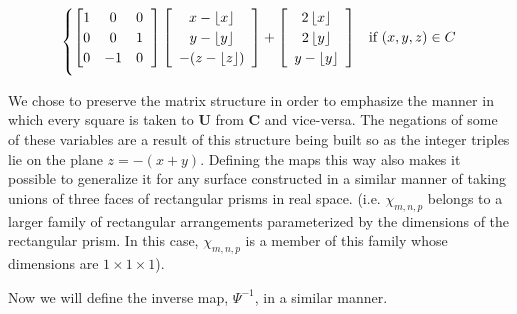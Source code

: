 \documentclass[]{article}
\begin{document}
\begin{equation}
\begin{cases}
		\left[ \begin{matrix}
		1 & 0 & 0 \\
		0 & 0 & 1 \\
		0 & -1 & 0
		\end{matrix}\hspace{2mm}\right]
		\left[\begin{array}{c}
			x - \left\lfloor x \right\rfloor
			\\ y- \left\lfloor y \right\rfloor
			\\ -(z - \left\lfloor z \right\rfloor)
			\end{array} \right]
		+
			\left[\begin{array}{c}
				2 \left\lfloor x \right\rfloor
				\\ 2\left\lfloor y \right\rfloor
				\\ y - \left\lfloor y \right\rfloor
			\end{array} \right]
				& \text{if } (x,y,z)\in C	\vspace{2mm}
\end{cases}
\end{equation}

We chose to preserve the matrix structure in order to emphasize the manner in which every square is taken to $\mathbf{U}$ from $\mathbf{C}$ and vice-versa. The negations of some of these variables are a result of this structure being built so as the integer triples lie on the plane $z=-(x+y)$. Defining the maps this way also makes it possible to generalize it for any surface constructed in a similar manner of taking unions of three faces of rectangular prisms in real space. (i.e. $\chi_{m,n,p}$ belongs to a larger family of rectangular arrangements parameterized by the dimensions of the rectangular prism. In this case, $\chi_{m,n,p}$ is a member of this family whose dimensions are $1\times1\times1$). 

Now we will define the inverse map, $\Psi^{-1}$, in a similar manner. 
\end{document}
